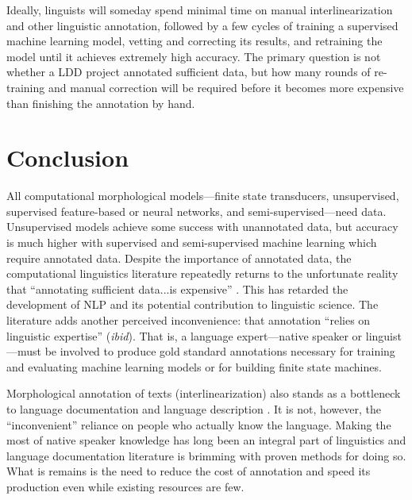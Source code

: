 \documentclass[12pt]{article}
\begin{document}

Ideally, linguists will someday spend minimal time on manual interlinearization and other linguistic annotation, followed by a few cycles of training a supervised machine learning model, vetting and correcting its results, and retraining the model until it achieves extremely high accuracy. The primary question is not whether a LDD project annotated sufficient data, but how many rounds of re-training and manual correction will be required before it becomes more expensive than finishing the annotation by hand. 

\section{Conclusion}

All computational morphological models—finite state transducers, unsupervised, supervised feature-based or neural networks, and semi-supervised---need data. Unsupervised models achieve some success with unannotated data, but accuracy is much higher with supervised and semi-supervised machine learning which require annotated data. Despite the importance of annotated data, the computational linguistics literature repeatedly returns to the unfortunate reality that ``annotating sufficient data...is expensive'' \cite[p. 1954]{cotterell_cross-lingual_2017}. This has retarded the development of NLP and its potential contribution to linguistic science. The literature adds another perceived inconvenience: that annotation ``relies on linguistic expertise'' (\textit{ibid}). That is, a language expert—native speaker or linguist—must be involved to produce gold standard annotations necessary for training and evaluating machine learning models or for building finite state machines.

Morphological annotation of texts (interlinearization) also stands as a bottleneck to language documentation and language description \cite{bird_documentary_2015,bettinson_developing_2017,holton_developing_2017}. It is not, however, the ``inconvenient'' reliance on people who actually know the language. Making the most of native speaker knowledge has long been an integral part of linguistics and language documentation literature is brimming with proven methods for doing so. What is remains is the need to reduce the cost of annotation and speed its production even while existing resources are few. 
\end{document}
